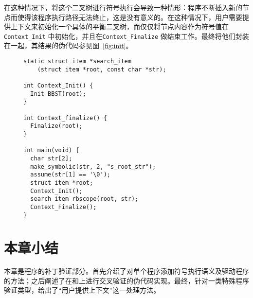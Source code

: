 在这种情况下，将这个二叉树进行符号执行会导致一种情形：程序不断插入新的节点而使得该程序执行路径无法终止，这是没有意义的。在这种情况下，用户需要提供上下文来初始化一个具体的平衡二叉树，而仅仅将节点内容作为符号值在\texttt{\textmd{Context\_Init}} 中初始化，并且在\texttt{\textmd{Context\_Finalize}} 做结束工作。最终\dryrun 将他们封装在一起，其结果的伪代码参见图~\ref{fig:init}。

\begin{figure}[t]
\begin{center}
\begin{lstlisting}[language={[ANSI]C}]
static struct item *search_item
    (struct item *root, const char *str);

int Context_Init() {
  Init_BBST(root);
}

int Context_finalize() {
  Finalize(root);
}

int main(void) {
  char str[2];
  make_symbolic(str, 2, "s_root_str");
  assume(str[1] == '\0');
  struct item *root;
  Context_Init();
  search_item_rbscope(root, str);
  Context_Finalize();
}
\end{lstlisting}
\vspace{-0.5cm}
\end{center}
\end{figure}


\section{本章小结}
\label{sec:c4}
本章是程序的补丁验证部分。首先介绍了对单个程序添加符号执行语义及驱动程序的方法；之后阐述了在\bug 和\patch 上进行交叉验证的伪代码实现。最终，针对一类特殊程序验证类型，给出了“用户提供上下文”这一处理方法。